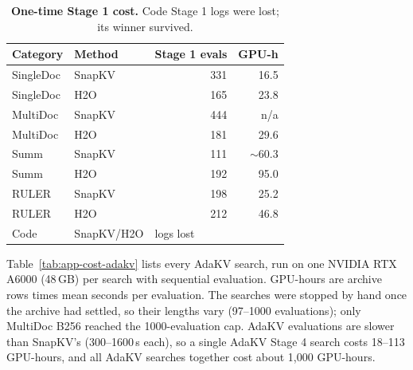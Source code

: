 \begin{table}[t]
  \centering
  \footnotesize
  \setlength{\tabcolsep}{4pt}
  \begin{tabular}{@{}l l r r@{}}
    \toprule
    Category & Method & Stage 1 evals & GPU-h \\
    \midrule
    SingleDoc & SnapKV & 331 & 16.5 \\
    SingleDoc & H2O & 165 & 23.8 \\
    MultiDoc & SnapKV & 444 & n/a \\
    MultiDoc & H2O & 181 & 29.6 \\
    Summ & SnapKV & 111 & $\sim$60.3 \\
    Summ & H2O & 192 & 95.0 \\
    RULER & SnapKV & 198 & 25.2 \\
    RULER & H2O & 212 & 46.8 \\
    Code & SnapKV/H2O & \multicolumn{2}{l}{logs lost} \\
    \bottomrule
  \end{tabular}
  \caption{\textbf{One-time Stage 1 cost.} Code Stage 1 logs were lost; its winner survived.}
  \label{tab:app-step1}
\end{table}


Table~\ref{tab:app-cost-adakv} lists every AdaKV search, run on one NVIDIA RTX A6000 (48\,GB) per search with sequential evaluation. GPU-hours are archive rows times mean seconds per evaluation. The searches were stopped by hand once the archive had settled, so their lengths vary (97--1000 evaluations); only MultiDoc B256 reached the 1000-evaluation cap. AdaKV evaluations are slower than SnapKV's (300--1600\,s each), so a single AdaKV Stage 4 search costs 18--113 GPU-hours, and all AdaKV searches together cost about 1{,}000 GPU-hours.

